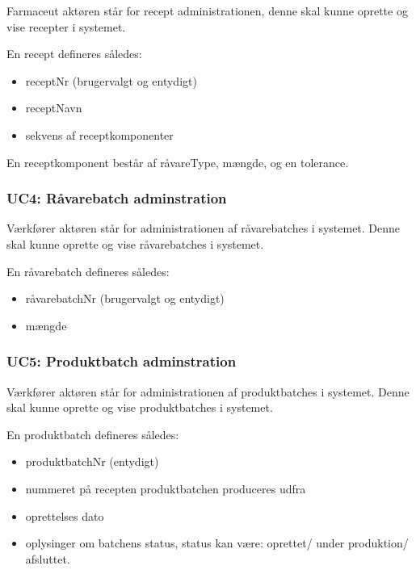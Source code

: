 \documentclass[a4paper]{article}
\begin{document}
Farmaceut aktøren står for recept administrationen, denne skal kunne oprette og vise recepter i systemet.

En recept defineres således:
\begin{itemize}
  \item receptNr (brugervalgt og entydigt)
  \item receptNavn
  \item sekvens af receptkomponenter
\end{itemize}

En receptkomponent består af råvareType, mængde, og en tolerance.


\subsubsection{UC4: Råvarebatch adminstration} %

Værkfører aktøren står for administrationen af råvarebatches i systemet. Denne skal kunne oprette og vise råvarebatches i systemet. 

En råvarebatch defineres således:

\begin{itemize}
  \item råvarebatchNr (brugervalgt og entydigt)
  \item mængde
\end{itemize}


\subsubsection{UC5: Produktbatch adminstration} %

Værkfører aktøren står for administrationen af produktbatches i systemet. Denne skal kunne oprette og vise produktbatches i systemet.

En produktbatch defineres således:

\begin{itemize}
  \item produktbatchNr (entydigt)
  \item nummeret på recepten produktbatchen produceres udfra
  \item oprettelses dato
  \item oplysinger om batchens status, status kan være: oprettet/ under produktion/ afsluttet.
\end{itemize}
\end{document}

